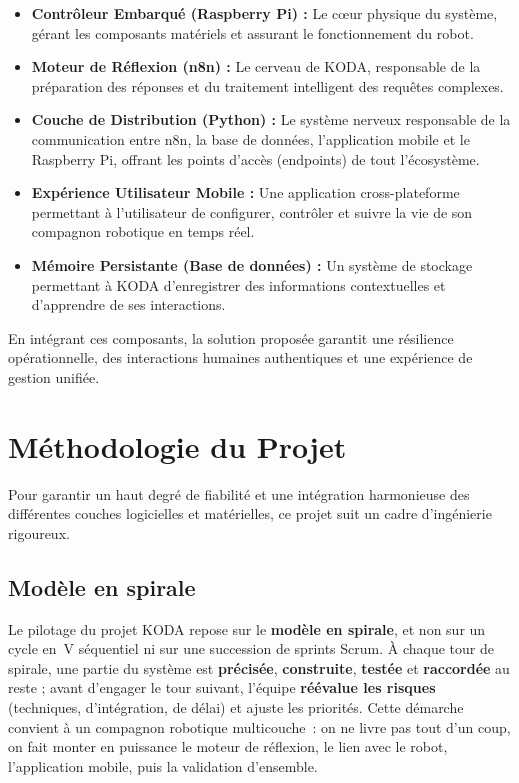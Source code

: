 \documentclass[a4paper,12pt]{report}
\newcommand{\sectiontitle}[1]{\needspace{4\baselineskip}\section{#1}}
\newcommand{\subsectiontitle}[1]{\needspace{3\baselineskip}\subsection{#1}}
\begin{document}
\begin{itemize}
	\item \textbf{Contrôleur Embarqué (Raspberry Pi) :} Le cœur physique du système, gérant les composants matériels et assurant le fonctionnement du robot.
	
	\item \textbf{Moteur de Réflexion (n8n) :} Le cerveau de KODA, responsable de la préparation des réponses et du traitement intelligent des requêtes complexes.
	
	\item \textbf{Couche de Distribution (Python) :} Le système nerveux responsable de la communication entre n8n, la base de données, l'application mobile et le Raspberry Pi, offrant les points d'accès (endpoints) de tout l'écosystème.
	
	\item \textbf{Expérience Utilisateur Mobile :} Une application cross-plateforme permettant à l'utilisateur de configurer, contrôler et suivre la vie de son compagnon robotique en temps réel.
	
	\item \textbf{Mémoire Persistante (Base de données) :} Un système de stockage permettant à KODA d'enregistrer des informations contextuelles et d'apprendre de ses interactions.
\end{itemize}

En intégrant ces composants, la solution proposée garantit une résilience opérationnelle, des interactions humaines authentiques et une expérience de gestion unifiée.

	
	
	
	\sectiontitle{Méthodologie du Projet}
	
	Pour garantir un haut degré de fiabilité et une intégration harmonieuse des différentes couches logicielles et matérielles, ce projet suit un cadre d'ingénierie rigoureux.
	
	\subsectiontitle{Modèle en spirale}
	
	Le pilotage du projet KODA repose sur le \textbf{modèle en spirale}, et non sur un
	cycle en~V séquentiel ni sur une succession de sprints Scrum. À chaque tour de
	spirale, une partie du système est \textbf{précisée}, \textbf{construite},
	\textbf{testée} et \textbf{raccordée} au reste ; avant d'engager le tour suivant,
	l'équipe \textbf{réévalue les risques} (techniques, d'intégration, de délai) et
	ajuste les priorités. Cette démarche convient à un compagnon robotique
	multicouche~: on ne livre pas tout d'un coup, on fait monter en puissance le moteur
	de réflexion, le lien avec le robot, l'application mobile, puis la validation
	d'ensemble.
	
\end{document}

